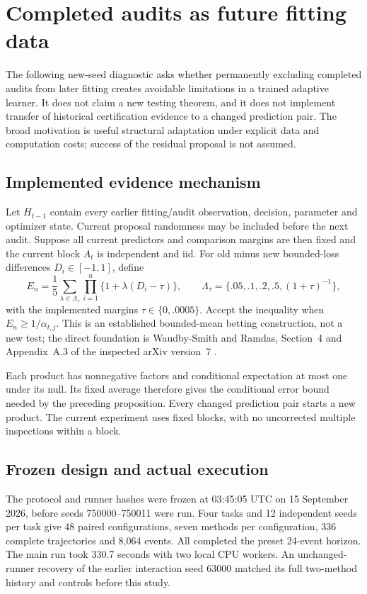 \providecommand{\experimentroot}{.}
\section{Completed audits as future fitting data}
\label{sec:audit-release-diagnostic}

The following new-seed diagnostic asks whether permanently excluding completed
audits from later fitting creates avoidable limitations in a trained adaptive
learner. It does not claim a new testing theorem, and it does not implement
transfer of historical certification evidence to a changed prediction pair.
The broad motivation is useful structural adaptation under explicit data and
computation costs; success of the residual proposal is not assumed.

\subsection{Implemented evidence mechanism}
Let $H_{t-1}$ contain every earlier fitting/audit observation, decision,
parameter and optimizer state. Current proposal randomness may be included
before the next audit. Suppose all current predictors and comparison margins
are then fixed and the current block $A_t$ is independent and iid. For old
minus new bounded-loss differences $D_i\in[-1,1]$, define
\[
 E_n=\frac15\sum_{\lambda\in\Lambda_\tau}
       \prod_{i=1}^n\{1+\lambda(D_i-\tau)\},\qquad
 \Lambda_\tau=\{.05,.1,.2,.5,(1+\tau)^{-1}\},
\]
with the implemented margins $\tau\in\{0,.0005\}$.
Accept the inequality when $E_n\ge 1/\alpha_{t,j}$. This is an established
bounded-mean betting construction, not a new test; the direct foundation is
Waudby-Smith and Ramdas, Section~4 and Appendix~A.3 of the inspected
arXiv version~7 \cite{waudby2024}.

Each product has nonnegative factors and conditional expectation at most one
under its null. Its fixed average therefore gives the conditional error bound
needed by the preceding proposition. Every changed prediction pair starts a
new product. The current experiment uses fixed blocks, with no uncorrected
multiple inspections within a block.

\subsection{Frozen design and actual execution}
The protocol and runner hashes were frozen at 03:45:05 UTC on
15 September 2026, before seeds 750000--750011 were run. Four tasks and
12 independent seeds per task give 48 paired configurations, seven methods
per configuration, 336 complete trajectories and 8,064 events. All completed
the preset 24-event horizon. The main run took 330.7 seconds with two local
CPU workers. An unchanged-runner recovery of the earlier interaction seed
63000 matched its full two-method history and controls before this study.

